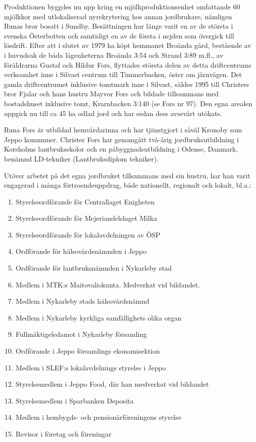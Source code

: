Produktionen byggdes nu upp kring en mjölkproduktionsenhet omfattande 60 mjölkkor med utlokaliserad nyrekrytering hos annan jordbrukare, nämligen Runas bror bosatt i Sundby. Besättningen har länge varit en av de största i svenska Österbotten och samtidigt en av de första i nejden som övergick till lösdrift. Efter att i slutet av 1979 ha köpt hemmanet Broända gård, bestående av i huvudsak de båda lägenheterna Broända 3:54 och Strand 3:89 m.fl., av föräldrarna Gustaf och Hildur Fors, flyttades största  delen av detta driftcentrums verksamhet inne i Silvast centrum till Timmerbacken, öster om järnvägen. Det gamla driftcentrumet inklusive tomtmark inne i Silvast, såldes 1995 till Christers bror Fjalar och hans hustru Mayvor Fors och bildade tillsammans med bostadshuset inklusive tomt, Kvarnbacken 3:140 (se Fors  nr 97). Den egna arealen uppgick nu till ca 45 ha odlad jord och har sedan dess avsevärt utökats.

Runa Fors är utbildad hemvårdarinna och har tjänstgjort i såväl Kronoby som Jeppo kommuner. Christer Fors har genomgått två-årig jordbruksutbildning i Korsholms lantbruksskolor och en påbyggnadsutbildning i Odense, Danmark, benämnd LD-tekniker (Lantbruksdiplom tekniker).

Utöver arbetet på det egna jordbruket tillsammans med sin hustru, har han varit engagerad i många förtroendeuppdrag, både nationellt, regionalt och lokalt, bl.a.:
\begin{enumerate}
  \item Styrelseordförande för Centrallaget Enigheten
  \item Styrelseordförande för Mejeriandelslaget Milka
  \item Styrelseordförande för lokalavdelningen av ÖSP
  \item Ordförande för hälsovårdsnämnden i Jeppo
  \item Ordförande för lantbruksnämnden i Nykarleby stad
  \item Medlem i MTK:s Maitovaliokunta. Medverkat vid bildandet.
  \item Medlem i Nykarleby stads hälsovårdsnämnd
  \item Medlem i Nykarleby kyrkliga samfällighets olika organ
  \item Fullmäktigeledamot i Nykarleby församling
  \item Ordförande i Jeppo församlings ekonomisektion
  \item Medlem i SLEF:s lokalavdelnings styrelse i Jeppo
  \item Styrelsemedlem i Jeppo Food, där han medverkat vid bildandet
  \item Styrelsemedlem i Sparbanken Deposita
  \item Medlem i hembygds- och pensionärföreningens styrelse
  \item Revisor i företag och föreningar
\end{enumerate}


